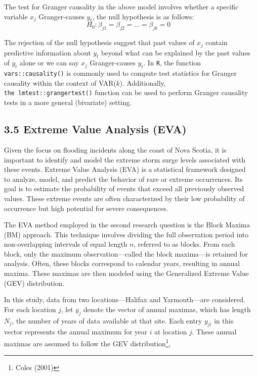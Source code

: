 \documentclass[
  letterpaper,
  DIV=11,
  numbers=noendperiod]{scrartcl}
\begin{document}
The test for Granger causality in the above model involves whether a
specific variable \(x_j\) Granger-causes \(y_t\), the null hypothesis is
as follows: \[H_0: \beta_{j1}=\beta_{j2}=\dots =\beta_{jk}=0\]

The rejection of the null hypothesis suggest that past values of \(x_j\)
contain predictive information about \(y_t\) beyond what can be
explained by the past values of \(y_t\) alone or we can say \(x_j\)
Granger-causes \(y_t\). In \texttt{R}, the function
\texttt{vars::causality()} is commonly used to compute test statistics
for Granger causality within the context of VAR(\(k\)). Additionally,
\texttt{the\ lmtest::grangertest()} function can be used to perform
Granger causality tests in a more general (bivariate) setting.

\subsection{3.5 Extreme Value Analysis
(EVA)}\label{extreme-value-analysis-eva}

\indent Given the focus on flooding incidents along the coast of Nova
Scotia, it is important to identify and model the extreme storm surge
levels associated with these events. Extreme Value Analysis (EVA) is a
statistical framework designed to analyze, model, and predict the
behavior of rare or extreme occurrences. Its goal is to estimate the
probability of events that exceed all previously observed values. These
extreme events are often characterized by their low probability of
occurrence but high potential for severe consequences.

\indent The EVA method employed in the second research question is the
Block Maxima (BM) approach. This technique involves dividing the full
observation period into non-overlapping intervals of equal length \(n\),
referred to as blocks. From each block, only the maximum
observation---called the block maxima---is retained for analysis. Often,
these blocks correspond to calendar years, resulting in annual maxima.
These maximas are then modeled using the Generalized Extreme Value (GEV)
distribution.

\indent In this study, data from two locations---Halifax and
Yarmouth---are considered. For each location \(j\), let \(y_j\) denote
the vector of annual maximas, which has length \(N_j\), the number of
years of data available at that site. Each entry \(y_{ji}\) in this
vector represents the annual maximum for year \(i\) at location \(j\).
These annual maximas are assumed to follow the GEV
distribution\footnote{Coles (2001)},
\end{document}
